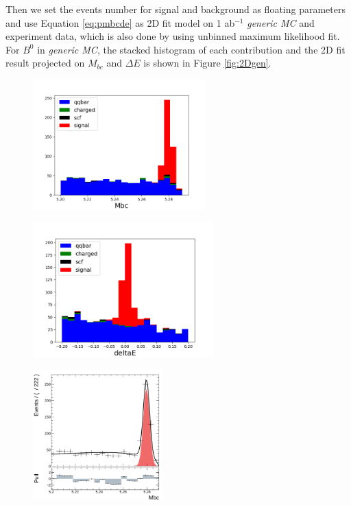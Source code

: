 Then we set the events number for signal and background as floating parameters and use Equation \ref{eq:pmbcde} as 2D fit model on 1 ab$^{-1}$ \textit{generic MC} and experiment data, which is also done by using unbinned maximum likelihood fit.
For $B^0$ in \textit{generic MC}, the stacked histogram of each contribution and the 2D fit result projected on $M_{bc}$ and $\Delta E$ is shown in Figure \ref{fig:2Dgen}.
\begin{figure}[H]
	\begin{minipage}[b]{0.5\linewidth}
		\centering 
		\includegraphics[height=5cm]{figures/hist_stacked_generic_mbc}
		\label{}
	\end{minipage}
	\begin{minipage}[b]{0.5\linewidth}
		\centering 
		\includegraphics[height=5.2cm]{figures/hist_stacked_generic_dE}
		\label{}
	\end{minipage}
	\begin{minipage}[b]{0.5\linewidth}
		\centering 
		\includegraphics[height=5cm]{figures/mbc-hist-2d}
		\label{}

\end{minipage}
\end{figure}
